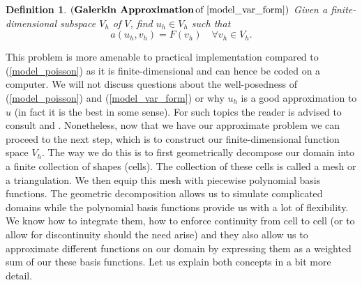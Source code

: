 \documentclass[12pt,a4paper]{article}
\newtheorem{definition}[theorem]{Definition}
\theoremstyle{definition}
\begin{document}
\theoremstyle{definition}
\begin{definition}{$\left(\textbf{Galerkin Approximation}\,\text{of \ref{model_var_form}}\right)$} 
	Given a finite-dimensional subspace $V_h$ of $V$, find  $u_h \in V_h$ such that
	\begin{equation}
a\left(u_h,v_h\right)=F\left(v_h\right) \quad \forall v_h \in V_h.
	\end{equation}
\end{definition}
This problem is more amenable to practical implementation compared to (\ref{model_poisson}) as it is finite-dimensional and can hence be coded on a computer.  We will not discuss questions about the well-posedness of (\ref{model_poisson}) and (\ref{model_var_form}) or why $u_h$ is a good approximation to $u$ (in fact it is the best in some sense).  For such topics the reader is advised to consult \cite{brenner2007mathematical} and \cite{ern2013theory}. Nonetheless, now that we have our approximate problem we can proceed to the next step, which is  to construct our finite-dimensional function space $V_h$.  
The way we do this is to first geometrically decompose our domain into a finite collection of shapes (cells).  The collection of these cells is called a mesh or a triangulation.  We then equip this mesh with piecewise polynomial basis functions.  The geometric decomposition allows us to simulate complicated domains while the polynomial basis functions provide us with a lot of flexibility.  We know how to integrate them, how to enforce continuity from cell to cell (or to allow for discontinuity should the need arise) and they also allow us to approximate different functions on our domain  by expressing them as a weighted sum of our these basis functions.  Let us explain both concepts in a bit more detail.
\end{document}
